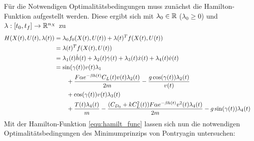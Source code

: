 Für die Notwendigen Optimalitätsbedingungen muss zunächst die Hamilton-Funktion aufgestellt werden. Diese ergibt sich mit $\lambda_0 \in \mathbb{R}$ ($\lambda_0 \geq 0$) und $\lambda : [t_0,t_f] \to \mathbb{R}^{n_X}$ zu
\begin{equation} \label{equ:hamilt_func}
    \begin{split}
        H(X(t),U(t),\lambda(t)) &= \lambda_0 f_0(X(t),U(t)) + \lambda(t)^T f(X(t),U(t)) \\\
        &= \lambda(t)^T f(X(t),U(t)) \\\
        &= \lambda_1(t) \dot{h}(t) + \lambda_2(t) \dot{\gamma}(t) + \lambda_3(t) \dot{x}(t) + \lambda_4(t) \dot{v}(t) \\\
        &= \sin(\gamma(t)) v(t) \lambda_1 \\\
        &\hspace{7mm} + \dfrac{F \alpha e^{-\beta h(t)} C_L(t) v(t) \lambda_2(t)}{2m} - \dfrac{g \cos(\gamma(t)) \lambda_2(t)}{v(t)} \\\
        &\hspace{7mm} + \cos(\gamma(t)) v(t) \lambda_3(t) \\\
        &\hspace{7mm} + \dfrac{T(t) \lambda_4(t)}{m} - \dfrac{(C_{D_0} + k C_L^2(t)) F \alpha e^{-\beta h(t)} v^2(t) \lambda_4(t)}{2m} - g \sin(\gamma(t)) \lambda_4(t)
    \end{split}
\end{equation}
Mit der Hamilton-Funktion \ref{equ:hamilt_func} lassen sich nun die notwendigen Optimalitätsbedingungen des Minimumprinzips von Pontryagin untersuchen:
